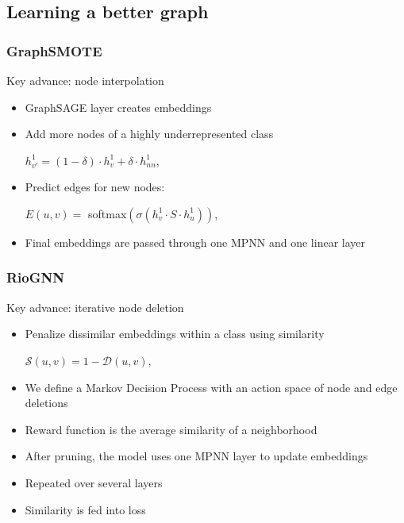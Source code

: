 \documentclass{beamer}
\begin{document}

\subsection{Learning a better graph}


\begin{frame}
    \frametitle{GraphSMOTE}
	Key advance: node interpolation
    \begin{itemize}
		\item GraphSAGE layer creates embeddings
        \item Add more nodes of a highly underrepresented class
		\begin{center}
		$h_{v'}^1 = (1-\delta) \cdot h^1_v + \delta \cdot h^1_{nn}$,
		\end{center}
		\item Predict edges for new nodes:
		
\begin{center}
$E(u,v) =$ softmax$(\sigma(h^1_v \cdot S \cdot h^1_u))$,
\end{center}
        
        \item Final embeddings are passed through one MPNN and one linear layer
    \end{itemize}
    

    \end{frame}
    


\begin{frame}
    \frametitle{RioGNN}
	Key advance: iterative node deletion 
    \begin{itemize}
        \item Penalize dissimilar embeddings within a class using similarity
        
        
\begin{center}
$\mathcal{S}(u,v) = 1 - \mathcal{D}(u,v)$,
\end{center}
        \item We define a Markov Decision Process with an action space of node and edge deletions
        \item Reward function is the average similarity of a neighborhood
        \item After pruning, the model uses one MPNN layer to update embeddings
        \item Repeated over several layers
        \item Similarity is fed into loss
    \end{itemize}
    

    \end{frame}
    
\end{document}
